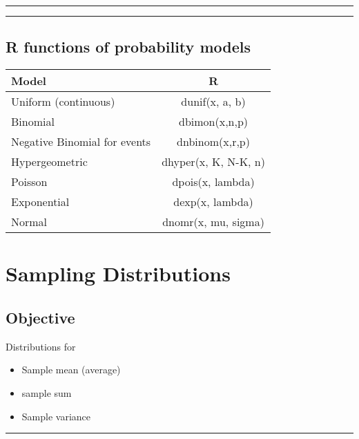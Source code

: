 \documentclass[
]{book}
\providecommand{\tightlist}{%
  \setlength{\itemsep}{0pt}\setlength{\parskip}{0pt}}
\begin{document}
\begin{center}\rule{0.5\linewidth}{0.5pt}\end{center}

\begin{center}\rule{0.5\linewidth}{0.5pt}\end{center}

\hypertarget{r-functions-of-probability-models}{%
\section{R functions of probability models}\label{r-functions-of-probability-models}}

\begin{longtable}[]{@{}lc@{}}
\toprule
Model & R \\
\midrule
\endhead
Uniform (continuous) & dunif(x, a, b) \\
Binomial & dbimon(x,n,p) \\
Negative Binomial for events & dnbinom(x,r,p) \\
Hypergeometric & dhyper(x, K, N-K, n) \\
Poisson & dpois(x, lambda) \\
Exponential & dexp(x, lambda) \\
Normal & dnomr(x, mu, sigma) \\
\bottomrule
\end{longtable}

\hypertarget{sampling-distributions}{%
\chapter{Sampling Distributions}\label{sampling-distributions}}

\hypertarget{objective-8}{%
\section{Objective}\label{objective-8}}

Distributions for

\begin{itemize}
\tightlist
\item
  Sample mean (average)
\item
  sample sum
\item
  Sample variance
\end{itemize}

\begin{center}\rule{0.5\linewidth}{0.5pt}\end{center}
\end{document}
